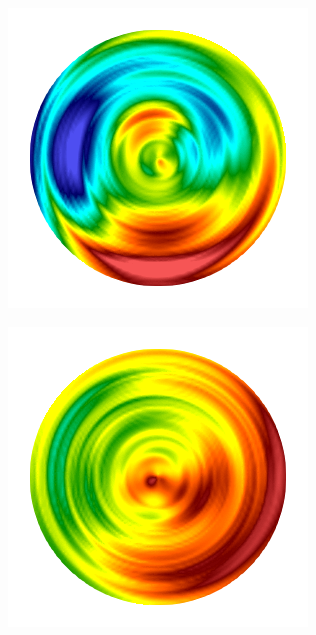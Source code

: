 \begin{figure}[htb!]
\begin{subfigure}{0.14\textwidth}
    \caption{}
  \end{subfigure}
  \hspace{0.02\textwidth}
  \begin{subfigure}{0.15\textwidth}
    \includegraphics[width=\textwidth]{Chapter4/figures/2D/Gc_ring.png}
    \caption{}
  \end{subfigure}
  \begin{subfigure}{0.15\textwidth}
    \includegraphics[width=\textwidth]{Chapter4/figures/2D/psic_ring.png}

\end{subfigure}
\end{figure}
